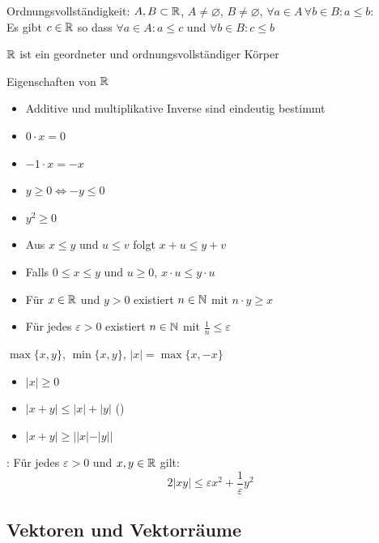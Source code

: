 \Satz Ordnungsvollständigkeit: $A, B \subset \mathbb{R}$, $A\ne \varnothing$, $B\ne \varnothing$,
$\forall a \in A \, \forall b \in B : a\le b$: \\
Es gibt $c \in \mathbb{R}$ so dass $\forall a \in A : a\le c$ und $\forall b \in B : c\le b$

\Satz $\mathbb{R}$ ist ein geordneter und ordnungsvollständiger Körper

\Kor Eigenschaften von $\mathbb{R}$
\vspace{-0.6em}
\begin{itemize}
    \item Additive und multiplikative Inverse sind eindeutig bestimmt
    \item $0 \cdot x = 0$
    \item $-1 \cdot x = -x$
    \item $y\ge 0 \iff -y\le 0$
    \item $y^2\ge 0$
    \item Aus $x\le y$ und $u\le v$ folgt $x + u\le y + v$
    \item Falls $0\le x\le y$ und $u\ge 0$, $x \cdot u\le y \cdot u$
\end{itemize}

\Kor {}
\vspace{-0.6em}
\begin{itemize}
    \item Für $x \in \mathbb{R}$ und $y > 0$ existiert $n \in \mathbb{N}$ mit $n \cdot y\ge x$
    \item Für jedes $\varepsilon > 0$ existiert $n \in \mathbb{N}$ mit $\frac{1}{n}\le \varepsilon$
\end{itemize}

\Def $\max\{x, y\}$, $\min\{x, y\}$,  $|x| = \max\{x, -x\}$

\Satz {}
\vspace{-0.6em}
\begin{itemize}
    \item $|x|\ge 0$
    \item $|x + y|\le |x| + |y|$ ()
    \item $|x + y|\ge ||x| - |y||$
\end{itemize}

\Satz {}: Für jedes $\varepsilon > 0$ und $x, y \in \mathbb{R}$ gilt:
$$2|xy|\le \varepsilon x^2 + \frac{1}{\varepsilon}y^2$$

\subsection{Vektoren und Vektorräume}


